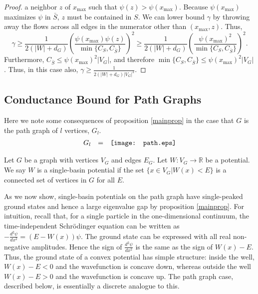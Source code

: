 \begin{proof}
a neighbor $z$ of $x_{\max}$ such that $\psi(z) >
\psi(x_{\max})$. Because $\psi(x_{\max})$ maximizes $\psi$ in
$\bar{S}$, $z$ must be contained in $S$. We can lower bound $\gamma$
by throwing away the flows across all edges in the numerator other
than $(x_{\max},z)$. Thus,
\begin{equation}
\gamma \geq \frac{1}{2(|W|+d_G)} \left( \frac{\psi(x_{\max}) \psi(z)}
{\min\{C_{S},C_{\bar{S}}\}} \right)^2
\geq \frac{1}{2(|W|+d_G)} \left( \frac{\psi(x_{\max})^2}
{\min\{C_{S},C_{\bar{S}}\}} \right)^2.
\end{equation}
Furthermore, $C_{\bar{S}} \leq \psi(x_{\max})^2 |V_G|$, and therefore
$\min\{C_{S},C_{\bar{S}}\} \leq \psi(x_{\max})^2 |V_G|$. 
Thus, in this case also, $\gamma \geq \frac{1}{2 (|W|+d_G) |V_G|^2}$.
\end{proof}

\subsection{Conductance Bound for Path Graphs}
\label{conductance1D}

Here we note some consequences of proposition \ref{mainprop} in the
case that $G$ is the path graph of $l$ vertices, $G_l$.
\[
\begin{array}{rcl}
G_l & = & \texttt{[image: path.eps]}
\end{array} \vspace{10pt}
\]

\begin{definition}
Let $G$ be a graph with vertices $V_G$ and edges $E_G$. Let $W:V_G \to
\mathbb{R}$ be a potential. We say $W$ is a single-basin potential
if the set $\{x \in V_G| W(x) < E\}$ is a connected set of vertices in
$G$ for all $E$.
\end{definition}

As we now show, single-basin potentials on the path graph have
single-peaked ground states and hence a large eigenvalue gap by
proposition \ref{mainprop}. For intuition, recall that, for a single
particle in the one-dimensional continuum, the time-independent
Schr\"odinger equation can be written as 
$-\frac{d^2 \psi}{dx^2} = (E-W(x)) \psi$. The ground state can be
expressed with all real non-negative amplitudes. Hence the sign of
$\frac{d^2 \psi}{dx^2}$ is the same as the sign of $W(x)-E$. Thus, the
ground state of a convex potential has simple structure: inside the
well, $W(x)-E < 0$ and the wavefunction is concave down, whereas
outside the well $W(x)-E > 0$ and the wavefunction is concave up. The
path graph case, described below, is essentially a discrete analogue
to this. \\

